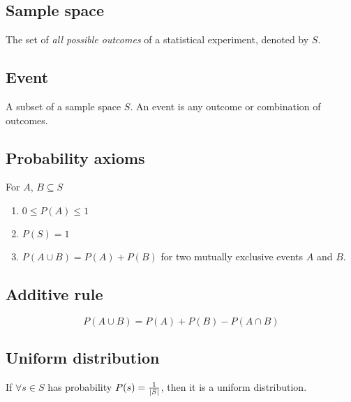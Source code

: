 \subsection{Sample space}
    \begin{definition}
        The set of \emph{all possible outcomes} of a statistical experiment, denoted by $S$.
    \end{definition}

\subsection{Event}
    \begin{definition}
        A subset of a sample space $S$. An event is any outcome or combination of outcomes.
    \end{definition}

\subsection{Probability axioms}
    \begin{definition}
        For $A$, $B \subseteq S$
        \begin{enumerate}
            \item $0 \leq P(A) \leq 1$
            \item $P(S) = 1$
            \item $P(A \cup B) = P(A) + P(B)$ for two mutually exclusive events $A$ and $B$. 
        \end{enumerate}
    \end{definition}

\subsection{Additive rule}
    \begin{definition}
        \begin{equation}
            P(A \cup B) = P(A) + P(B) - P(A\cap B)
        \end{equation}
    \end{definition}

\subsection{Uniform distribution}
    \begin{definition}
        If $\forall s\in S$ has probability $P(s) = \frac{1}{\abs{S}}$, then it is a uniform distribution.
    \end{definition}


